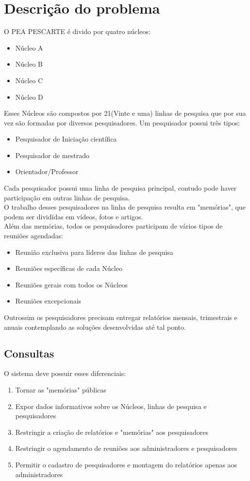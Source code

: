 \documentclass[11pt]{../../classes/ifscarticle}
\begin{document}
\section{Descrição do problema}

O PEA PESCARTE é divido por quatro núcleos:
\begin{itemize}
    \item Núcleo A
    \item Núcleo B
    \item Núcleo C
    \item Núcleo D
\end{itemize}
Esses Núcleos são compostos por 21(Vinte e uma) linhas
de pesquisa que por sua vez são formadas por
diversos pesquisadores. Um pesquisador possui três tipos:
\begin{itemize}
    \item Pesquisador de Iniciação científica
    \item Pesquisador de mestrado
    \item Orientador/Professor
\end{itemize}
Cada pesquisador possui uma linha de pesquisa principal,
contudo pode haver participação em outras linhas de pesquisa.\\
O trabalho desses pesquisadores na linha de pesquisa resulta
em "memórias", que podem ser dividídas em vídeos, fotos e artigos.\\
Além das memórias, todos os pesquisadores participam de vários tipos
de reuniões agendadas:
\begin{itemize}
    \item Reunião exclusiva para líderes das linhas de pesquisa
    \item Reuniões específicas de cada Núcleo
    \item Reuniões gerais com todos os Núcleos
    \item Reuniões excepcionais
\end{itemize}
Outrossim os pesquisadores precisam entregar relatórios mensais,
trimestrais e anuais contemplando as soluções desenvolvidas até tal ponto.

\subsection{Consultas}
O sistema deve possuir esses diferenciais:
\begin{enumerate}
    \item Tornar as "memórias" públicas
    \item Expor dados informativos sobre os Núcleos, linhas de pesquisa e pesquisadores
    \item Restringir a criação de relatórios e "memórias" aos pesquisadores
    \item Restringir o agendamento de reuniões aos administradores e pesquisadores
    \item Permitir o cadastro de pesquisadores e montagem do relatórios apenas aos administradores
\end{enumerate}
\end{document}
